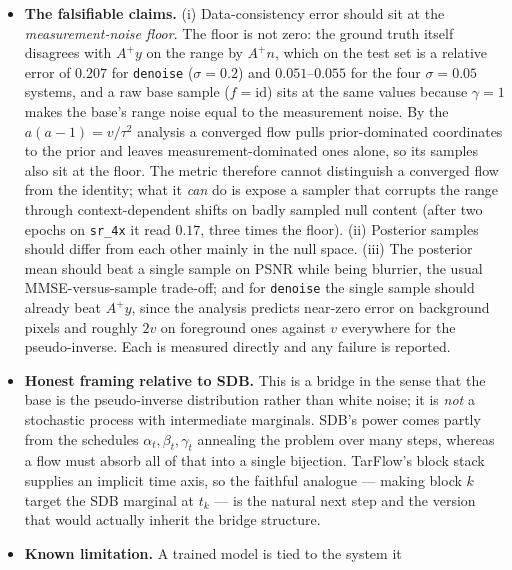 \documentclass[11pt]{article}
\begin{document}
\begin{itemize}
        as it must be for the value to be a likelihood --- it is easy to drop
        because it does not affect gradients.
  \item \textbf{The falsifiable claims.} (i) Data-consistency error should
        sit at the \emph{measurement-noise floor}. The floor is not zero:
        the ground truth itself disagrees with $A^{+}y$ on the range by
        $A^{+}n$, which on the test set is a relative error of $0.207$ for
        \texttt{denoise} ($\sigma = 0.2$) and $0.051$--$0.055$ for the four
        $\sigma = 0.05$ systems, and a raw base sample ($f = \mathrm{id}$)
        sits at the same values because $\gamma = 1$ makes the base's range
        noise equal to the measurement noise. By the $a(a-1) = v/\tau^2$
        analysis a converged flow pulls prior-dominated coordinates to the
        prior and leaves measurement-dominated ones alone, so its samples
        also sit at the floor. The metric therefore cannot distinguish a
        converged flow from the identity; what it \emph{can} do is expose a
        sampler that corrupts the range through context-dependent shifts on
        badly sampled null content (after two epochs on \texttt{sr\_4x} it
        read $0.17$, three times the floor). (ii) Posterior samples should
        differ from each other mainly in the null space. (iii) The posterior
        mean should beat a single sample on PSNR while being blurrier, the
        usual MMSE-versus-sample trade-off; and for \texttt{denoise} the
        single sample should already beat $A^{+}y$, since the analysis
        predicts near-zero error on background pixels and roughly $2v$ on
        foreground ones against $v$ everywhere for the pseudo-inverse. Each
        is measured directly and any failure is reported.
  \item \textbf{Honest framing relative to SDB.} This is a bridge in the sense
        that the base is the pseudo-inverse distribution rather than white
        noise; it is \emph{not} a stochastic process with intermediate
        marginals. SDB's power comes partly from the schedules
        $\alpha_t, \beta_t, \gamma_t$ annealing the problem over many steps,
        whereas a flow must absorb all of that into a single bijection.
        TarFlow's block stack supplies an implicit time axis, so the faithful
        analogue --- making block $k$ target the SDB marginal at $t_k$ --- is
        the natural next step and the version that would actually inherit the
        bridge structure.
  \item \textbf{Known limitation.} A trained model is tied to the system it

\end{itemize}
\end{document}
